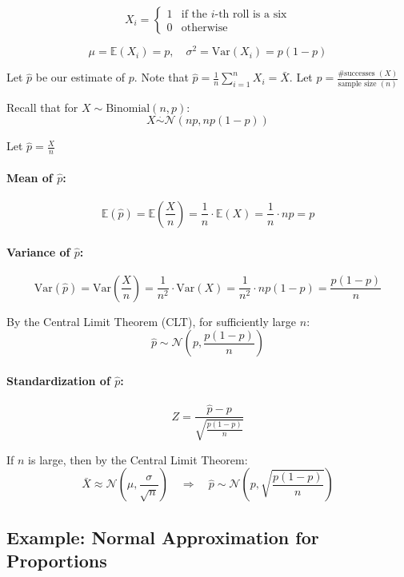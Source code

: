 \[
X_i =
\begin{cases}
1 & \text{if the $i$-th roll is a six} \\
0 & \text{otherwise}
\end{cases}
\]

\[
\mu = \mathbb{E}(X_i) = p, \quad \sigma^2 = \mathrm{Var}(X_i) = p(1 - p)
\]

Let $\hat{p}$ be our estimate of $p$. Note that $\hat{p} = \frac{1}{n} \sum_{i=1}^{n} X_i = \bar{X}$.
Let $\hat{p} = \frac{\text{\# successes } (X)}{\text{sample size } (n)}$

Recall that for $X \sim \text{Binomial}(n, p)$:
\[
X \overset{\cdot}{\sim} \mathcal{N}(np, np(1 - p))
\]

Let $\hat{p} = \frac{X}{n}$

\paragraph*{Mean of $\hat{p}$:}

\[
\mathbb{E}(\hat{p}) = \mathbb{E} \left( \frac{X}{n} \right) = \frac{1}{n} \cdot \mathbb{E}(X) = \frac{1}{n} \cdot np = p
\]

\paragraph*{Variance of $\hat{p}$:}

\[
\mathrm{Var}(\hat{p}) = \mathrm{Var} \left( \frac{X}{n} \right) = \frac{1}{n^2} \cdot \mathrm{Var}(X) = \frac{1}{n^2} \cdot np(1 - p) = \frac{p(1 - p)}{n}
\]

By the Central Limit Theorem (CLT), for sufficiently large $n$:
\[
\hat{p} \sim \mathcal{N} \left( p, \frac{p(1 - p)}{n} \right)
\]

\paragraph*{Standardization of $\hat{p}$:}
\[
Z = \frac{\hat{p} - p}{\sqrt{ \frac{p(1 - p)}{n} }}
\]

If $n$ is large, then by the Central Limit Theorem:
\[
\bar{X} \approx \mathcal{N} \left( \mu, \frac{\sigma}{\sqrt{n}} \right)
\quad \Rightarrow \quad
\hat{p} \sim \mathcal{N} \left( p, \sqrt{\frac{p(1 - p)}{n}} \right)
\]
\subsection*{Example: Normal Approximation for Proportions}

